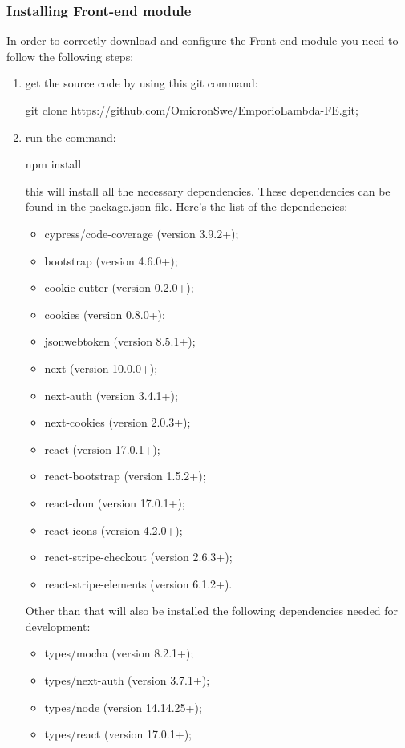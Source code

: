 \subsubsection{Installing Front-end module}
In order to correctly download and configure the Front-end module you need to follow the following steps:
\begin{enumerate}
\item get the source code by using this git command:\begin{center}git clone https://github.com/OmicronSwe/EmporioLambda-FE.git;\end{center}
\item run the command:\begin{center}npm install\end{center}this will install all the necessary dependencies. These dependencies can be found in the package.json file.\newline{} Here's the list of the dependencies:
\begin{itemize}
\item cypress/code-coverage (version 3.9.2+);
\item bootstrap (version 4.6.0+);
\item cookie-cutter (version 0.2.0+);
\item cookies (version 0.8.0+);
\item jsonwebtoken (version 8.5.1+);
\item next (version 10.0.0+);
\item next-auth (version 3.4.1+);
\item next-cookies (version 2.0.3+);
\item react (version 17.0.1+);
\item react-bootstrap (version 1.5.2+);
\item react-dom (version 17.0.1+);
\item react-icons (version 4.2.0+);
\item react-stripe-checkout (version 2.6.3+);
\item react-stripe-elements (version 6.1.2+).
\end{itemize}
Other than that will also be installed the following dependencies needed for development:
\begin{itemize}
\item types/mocha (version 8.2.1+);
\item types/next-auth (version 3.7.1+);
\item types/node (version 14.14.25+);
\item types/react (version 17.0.1+);

\end{itemize}
\end{enumerate}
